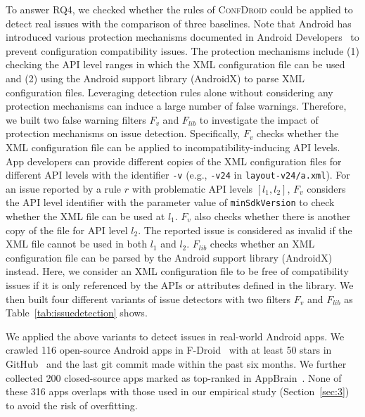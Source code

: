 To answer RQ4, we checked whether the rules of \textsc{ConfDroid} could be applied to detect real issues with the comparison of three baselines. Note that Android has introduced various protection mechanisms documented in Android Developers~\cite{androiddevelopers} to prevent configuration compatibility issues. The protection mechanisms include (1) checking the API level ranges in which the XML configuration file can be used and (2) using the Android support library (AndroidX) to parse XML configuration files. Leveraging detection rules alone without considering any protection mechanisms can induce a large number of false warnings. Therefore, we built two false warning filters $F_{v}$ and $F_{lib}$ to investigate the impact of protection mechanisms on issue detection. Specifically, $F_{v}$ checks whether the XML configuration file can be applied to incompatibility-inducing API levels. App developers can provide different copies of the XML configuration files for different API levels with the identifier \texttt{-v} (e.g., \texttt{-v24} in \texttt{layout-v24/a.xml}). For an issue reported by a rule $r$ with problematic API levels $[l_1, l_2]$, $F_{v}$ considers the API level identifier with the parameter value of \texttt{minSdkVersion} to check whether the XML file can be used at $l_1$. $F_{v}$ also checks whether there is another copy of the file for API level $l_2$. The reported issue is considered as invalid if the XML file cannot be used in both $l_1$ and $l_2$. $F_{lib}$ checks whether an XML configuration file can be parsed by the Android support library (AndroidX) instead. Here, we consider an XML configuration file to be free of compatibility issues if it is only referenced by the APIs or attributes defined in the library. We then built four different variants of issue detectors with two filters $F_{v}$ and $F_{lib}$ as Table~\ref{tab:issuedetection} shows.
	
We applied the above variants to detect issues in real-world Android apps.
We crawled 116 open-source Android apps in F-Droid~\cite{fdroid} with at least 50 stars in GitHub~\cite{github} and the last git commit made within the past six
months.
We further collected 200 closed-source apps marked as top-ranked in AppBrain~\cite{appbrain}.
None of these 316 apps overlaps with those used in our
empirical study (Section~\ref{sec:3}) to avoid the risk of overfitting.



